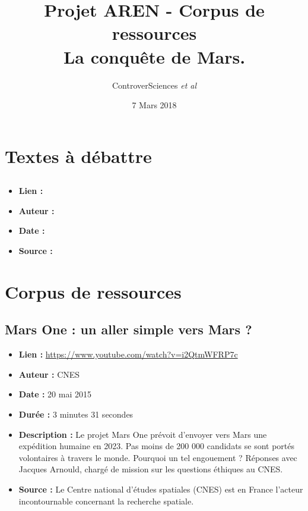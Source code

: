 \documentclass[8pt]{article}
\author{ControverSciences\textit{ et al} }
\title{Projet AREN - Corpus de ressources \\  La conquête de Mars.}
\date{7 Mars 2018}
\begin{document}
\maketitle

\tableofcontents

\newpage
\section{Textes à débattre}
\subsection{}
\begin{itemize}
	\item \textbf{Lien : }  \url{} 
	\item \textbf{Auteur : } 
	\item \textbf{Date : }  
	\item \textbf{Source : }  
\end{itemize}

\newpage

\newpage
\section{Corpus de ressources}

\subsection{Mars One : un aller simple vers Mars ?}
\begin{itemize}
	\item \textbf{Lien : }  \url{https://www.youtube.com/watch?v=i2QtmWFRP7c} 
	\item \textbf{Auteur : } CNES
	\item \textbf{Date : } 20 mai 2015
	\item \textbf{Durée : } 3 minutes 31 secondes
	\item \textbf{Description : } Le projet Mars One prévoit d'envoyer vers Mars une expédition humaine en 2023. Pas moins de 200 000 candidats se sont portés volontaires à travers le monde. Pourquoi un tel engouement ? Réponses avec Jacques Arnould, chargé de mission sur les questions éthiques au CNES.
	\item \textbf{Source : } Le Centre national d'études spatiales (CNES) est en France l'acteur incontournable concernant la recherche spatiale. 
\end{itemize}
\end{document}
